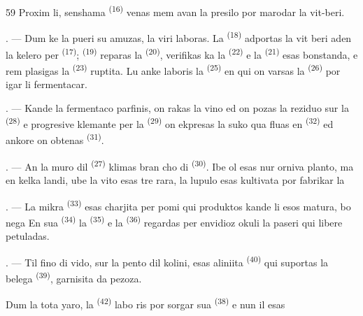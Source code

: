\begin{VUpage}[61]{59}
\VUcontinue
Proxim li, senshama  \textsuperscript{(16)} venas mem\nl
avan la presilo por marodar la vit-beri.

. --- Dum ke la pueri su amuzas, la viri\nl
laboras. La  \textsuperscript{(18)} adportas la vit\cc
beri aden la kelero per  \textsuperscript{(17)}; \cc
{} \textsuperscript{(19)} reparas la  \textsuperscript{(20)}, verifikas ka la\nl
{} \textsuperscript{(22)} e la  \textsuperscript{(21)} esas bonstanda, e rem\cc
plasigas la  \textsuperscript{(23)} ruptita. Lu anke laboris\nl
la  \textsuperscript{(25)} en qui on varsas la  \textsuperscript{(26)} por\nl
igar li fermentacar.

. --- Kande la fermentaco parfinis, on rakas\nl
la vino ed on pozas la reziduo sur la  \textsuperscript{(28)}\nl
e progresive klemante per la  \textsuperscript{(29)} on\nl
ekpresas la suko qua fluas en  \textsuperscript{(32)} ed\nl
ankore on obtenas  \textsuperscript{(31)}.

\VUsaut{6.0mm}
\VUsaut{3.4mm}

. --- An la muro dil  \textsuperscript{(27)} klimas bran\cc
cho di  \textsuperscript{(30)}. Ibe ol esas nur orniva planto,\nl
ma en kelka landi, ube la vito esas tre rara,\nl
la lupulo esas kultivata por fabrikar la 

. --- La mikra  \textsuperscript{(33)} esas charjita per\nl
pomi qui produktos kande li esos matura, bo\cc
nega  En sua  \textsuperscript{(34)} la  \textsuperscript{(35)} e la\nl
{} \textsuperscript{(36)} regardas per envidioz okuli la\nl
paseri qui libere petuladas.

. --- Til fino di vido, sur la pento dil kolini,\nl
esas aliniita  \textsuperscript{(40)} qui suportas la\nl
belega  \textsuperscript{(39)}, garnisita da \nl
pezoza.

\VUblancAlinea
Dum la tota yaro, la  \textsuperscript{(42)} labo\cc
ris por sorgar sua  \textsuperscript{(38)} e nun il esas
\parplein
\end{VUpage}

